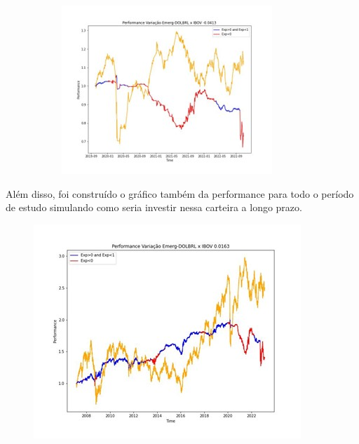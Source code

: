 \begin{figure}[H]
\begin{subfigure}{0.45\linewidth}
        \includegraphics[width = \textwidth]{relatorios/consult/imagens/Imagem8.jpg}
    \end{subfigure}   

\end{figure}

Além disso, foi construído o gráfico também da performance para todo o período de estudo simulando como seria investir nessa carteira a longo prazo.

\begin{figure}
    \includegraphics[width = \linewidth]{relatorios/consult/imagens/Imagem9.jpg}
\end{figure}


